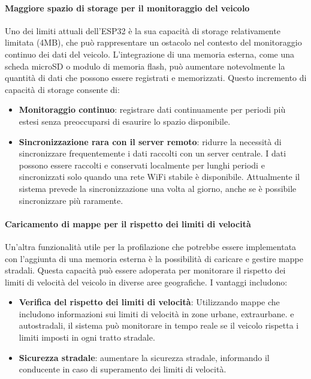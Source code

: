 \documentclass[12pt, a4paper, italian]{report}
\numberwithin{figure}{chapter}
\numberwithin{table}{chapter}
\begin{document}
\paragraph{Maggiore spazio di storage per il monitoraggio del veicolo} 
Uno dei limiti attuali dell'ESP32 è la sua capacità di storage relativamente limitata (4MB), che può rappresentare un ostacolo nel contesto del monitoraggio continuo dei dati del veicolo. L'integrazione di una memoria esterna, come una scheda microSD o modulo di memoria flash, può aumentare notevolmente la quantità di dati che possono essere registrati e memorizzati. Questo incremento di capacità di storage consente di:

\begin{itemize}
    \item \textbf{Monitoraggio continuo}: registrare dati continuamente per periodi più estesi senza preoccuparsi di esaurire lo spazio disponibile.
    \item \textbf{Sincronizzazione rara con il server remoto}: ridurre la necessità di sincronizzare frequentemente i dati raccolti con un server centrale. I dati possono essere raccolti e conservati localmente per lunghi periodi e sincronizzati solo quando una rete WiFi stabile è disponibile. Attualmente il sistema prevede la sincronizzazione una volta al giorno, anche se è possibile sincronizzare più raramente.
\end{itemize}

\paragraph{Caricamento di mappe per il rispetto dei limiti di velocità} 
Un'altra funzionalità utile per la profilazione che potrebbe essere implementata con l'aggiunta di una memoria esterna è la possibilità di caricare e gestire mappe stradali. Questa capacità può essere adoperata per monitorare il rispetto dei limiti di velocità del veicolo in diverse aree geografiche. I vantaggi includono:

\begin{itemize}
    \item \textbf{Verifica del rispetto dei limiti di velocità}: Utilizzando mappe che includono informazioni sui limiti di velocità in zone urbane, extraurbane. e autostradali, il sistema può monitorare in tempo reale se il veicolo rispetta i limiti imposti in ogni tratto stradale.
    \item \textbf{Sicurezza stradale}: aumentare la sicurezza stradale, informando il conducente in caso di superamento dei limiti di velocità. 
\end{itemize}
\end{document}
